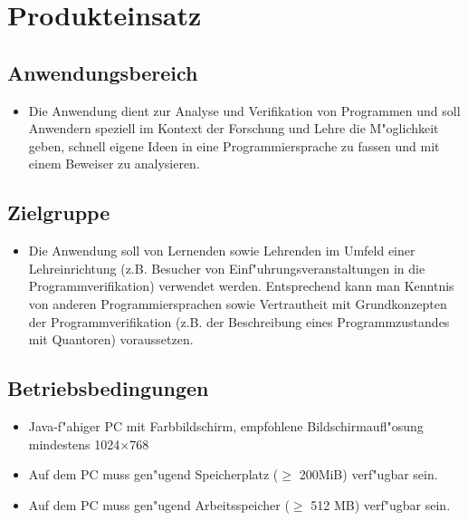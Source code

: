 \section{Produkteinsatz}%

\subsection{Anwendungsbereich}%

\begin{itemize}%
    \item Die Anwendung dient zur Analyse und \siehe Verifikation von Programmen und soll Anwendern speziell im Kontext der Forschung und Lehre die M"oglichkeit geben, schnell eigene Ideen in eine Programmiersprache zu fassen und mit einem \siehe Beweiser zu analysieren.%
\end{itemize}%

\subsection{Zielgruppe}%

\begin{itemize}%
    \item Die Anwendung soll von Lernenden sowie Lehrenden im Umfeld einer Lehreinrichtung (z.B. Besucher von Einf"uhrungsveranstaltungen in die Programmverifikation) verwendet werden. Entsprechend kann man Kenntnis von anderen Programmiersprachen sowie Vertrautheit mit Grundkonzepten der Programmverifikation (z.B. der Beschreibung eines \siehe Programmzustandes mit \siehe Quantoren) voraussetzen.%
\end{itemize}%

\subsection{Betriebsbedingungen}%

\begin{itemize}%
    \item \siehe Java-f"ahiger PC mit Farbbildschirm, empfohlene Bildschirmaufl"osung mindestens 1024$\times$768%
    \item Auf dem PC muss gen"ugend Speicherplatz ($\ge$ 200MiB) verf"ugbar sein.%
    \item Auf dem PC muss gen"ugend Arbeitsspeicher ($\ge$ 512 MB) verf"ugbar sein.%
\end{itemize}%
